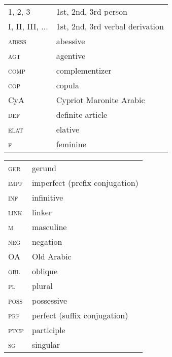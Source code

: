 \documentclass[output=paper]{langsci/langscibook}
\begin{document}
\begin{tabularx}{.5\textwidth}{@{}lQ@{}}
\textsc{1, 2, 3} & 1st, 2nd, 3rd person \\
\textsc{I, II, III, ...} & 1st, 2nd, 3rd verbal derivation \\
\textsc{abess} & abessive \\
\textsc{agt} & agentive \\
\textsc{comp} & complementizer \\
\textsc{cop} & copula \\
CyA & Cypriot Maronite Arabic \\
\textsc{def} & definite article \\
\textsc{elat} & elative \\
\textsc{f} & feminine \\
\end{tabularx}%
\begin{tabularx}{.5\textwidth}{@{}lQ@{}}
\textsc{ger} & gerund \\
\textsc{impf} & imperfect (prefix conjugation) \\
\textsc{inf} & infinitive \\
\textsc{link} & linker \\
\textsc{m} & masculine \\
\textsc{neg} & negation  \\
OA & Old Arabic \\
\textsc{obl} & oblique \\
\textsc{pl} & plural \\
\textsc{poss} & possessive  \\
\textsc{prf} & perfect (suffix conjugation) \\
\textsc{ptcp} & participle \\
\textsc{sg} & singular \\

\end{tabularx}%

{\sloppy\printbibliography[heading=subbibliography,notkeyword=this]}
\end{document}
